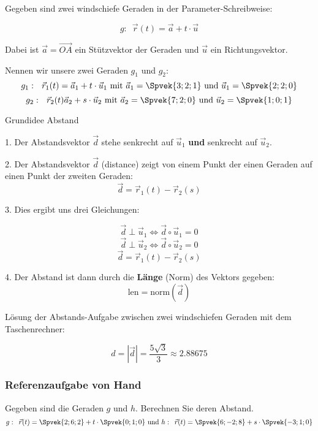 Gegeben sind zwei windschiefe Geraden in der Parameter-Schreibweise:

$$g:\,\,\,  \vec{r}(t) = \vec{a}+t\cdot{}\vec{u}$$

Dabei ist $\vec{a} = \overrightarrow{OA}$ ein Stützvektor der Geraden
und $\vec{u}$ ein Richtungsvektor.

Nennen wir unsere zwei Geraden $g_1$ und $g_2$:
$$g_1:\,\,\,\, \vec{r}_1(t) =  \vec{a}_1+t\cdot{}\vec{u}_1 \text{ mit } \vec{a}_1
= \Spvek{3;2;1} \text{ und } \vec{u}_1= \Spvek{2;2;0}$$
$$g_2:\,\,\,\,  \vec{r}_2(t)\vec{a}_2+s\cdot{}\vec{u}_2 \text{ mit } \vec{a}_2
= \Spvek{7;2;0} \text{ und } \vec{u}_2= \Spvek{1;0;1}$$

\begin{rezept}{Grundidee Abstand}{}

  1. Der Abstandsvektor $\vec{d}$ stehe senkrecht auf $\vec{u}_1$
  \textbf{und} senkrecht auf $\vec{u}_2$.

  2. Der Abstandsvektor $\vec{d}$ (distance) zeigt von einem Punkt der einen Geraden auf
  einen Punkt der zweiten Geraden: $$\vec{d}=\vec{r}_1(t) - \vec{r}_2(s)$$

  3. Dies ergibt uns drei Gleichungen:

  $$\vec{d}\perp\vec{u}_1 \Longleftrightarrow{}  \vec{d}\circ{}\vec{u}_1 = 0$$
  $$\vec{d}\perp\vec{u}_2 \Longleftrightarrow{}  \vec{d}\circ{}\vec{u}_2 = 0$$
  $$\vec{d}=\vec{r}_1(t)-\vec{r}_2(s)$$

  4. Der Abstand ist dann durch die \textbf{Länge} (Norm) des Vektors gegeben:
  $$\text{len} = \text{norm}(\vec{d})$$
  
\end{rezept}
\newpage


Lösung der Abstands-Aufgabe zwischen zwei windschiefen Geraden mit dem
Taschenrechner:
\TRAINER{}


$$d = |\vec{d} | = \frac{5\sqrt{3}}{3} \approx 2.88675$$
\newpage
\subsubsection*{Referenzaufgabe von Hand}

Gegeben sind die Geraden $g$ und $h$. Berechnen Sie deren Abstand.
$$g: \,\,\, \vec{r}(t) = \Spvek{2;6;2} + t\cdot{}\Spvek{0;1;0} \text{
  und }  h: \,\,\, \vec{r}(t) = \Spvek{6;-2;8} + s\cdot{}\Spvek{-3;1;0} $$

